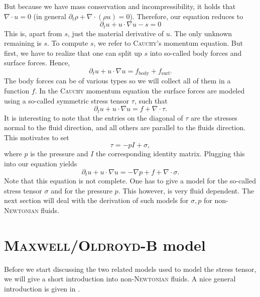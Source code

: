 \documentclass[12pt,a4paper,twoside, open=right]{scrreprt}
\theoremstyle{definition}
\theoremstyle{plain}
\begin{document}
But because we have mass conservation and incompressibility, it holds that $\nabla\cdot u =0$ (in general $\partial_t \rho + \nabla\cdot(\rho u) =0$). Therefore, our equation reduces to 
\begin{equation}
    \partial_t u+ u\cdot \nabla u -s =0
\end{equation}
This is, apart from $s$, just the material derivative of $u$.
The only unknown remaining is $s$. To compute $s$, we refer to \textsc{Cauchy}'s momentum equation. But first, we have to realize that one can split up $s$ into so-called body forces and surface forces. Hence, 
\begin{equation}
   \partial_t u + u\cdot \nabla u = f_{\mathrm{body}} +f_{\mathrm{surf}} .
\end{equation}
The body forces can be of various types so we will collect all of them in a function $f$. In the \textsc{Cauchy} momentum equation the surface forces are modeled using a  so-called symmetric stress tensor $\tau$, such that
\begin{equation}
    \partial_t u + u\cdot \nabla u = f + \nabla\cdot\tau.
\end{equation}
It is interesting to note that the entries on the diagonal of $\tau$ are the stresses normal to the fluid direction, and all others are parallel to the fluids direction. This motivates to set
\begin{equation}
    \tau = -pI+\sigma,
\end{equation}
where $p$ is the pressure and $I$ the corresponding identity matrix. Plugging this into our equation yields
\begin{equation}
    \partial_t u + u\cdot \nabla u = -\nabla p + f + \nabla\cdot\sigma.
\end{equation}
Note that this equation is not complete. One has to give a model for the so-called stress tensor $\sigma$ and for the pressure $p$. This however, is very fluid dependent. The next section will deal with the derivation of such models for $\sigma,p$ for non-\textsc{Newtonian} fluids.
\section{\textsc{Maxwell/Oldroyd-B} model}
\label{sec:physics}

Before we start discussing the two related models used to model the stress tensor, we will give a short introduction into non-\textsc{Newtonian} fluids. A nice general introduction is given in \cite{Ouellette2013}.
\end{document}
